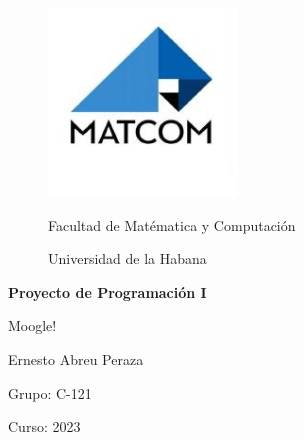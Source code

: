 \documentclass[12pt, a4paper]{article}
\renewcommand{\emph}{\textcolor{blue}}
\begin{document}
\begin{titlepage}
    \centering
    
    \begin{figure}[h]
        \center
        \includegraphics[width=5cm]{matcom.jpg}
        
        \Large Facultad de Matématica y Computación

        \large Universidad de la Habana
    \end{figure}

    
    \vspace{2cm}
    

    \vspace{2cm}

    {\Huge\bf Proyecto de Programación I \par Moogle!}

    
    \vfill

    \large Ernesto Abreu Peraza
    
    \small Grupo: C-121
    
    \small Curso: 2023
\end{titlepage}

\newpage

\renewcommand{\abstractname}{Descripción}

\begin{abstract}
    Moogle! es una aplicación \textit{"totalmente original"} cuyo propósito es buscar inteligentemente un texto en un
conjunto de documentos.

Es una aplicación web, desarrollada con tecnología .NET Core 6.0, específicamente usando Blazor como
framework web para la interfaz gráfica, y en el lenguaje C\#. La aplicación está dividida en dos componentes
fundamentales:
\begin{itemize}
    \item \emph{MoogleServer} es un servidor web que renderiza la interfaz gráfica y sirve los resultados.
    \item \emph{MoogleEngine} es una biblioteca de clases donde está... ehem... casi implementada la lógica del algoritmo de búsqueda.
\end{itemize}
\end{abstract}
\end{document}
